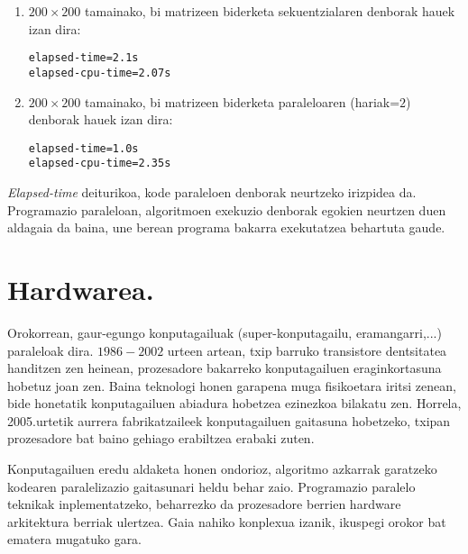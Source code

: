 \begin{enumerate}
\item $200 \times 200$ tamainako, bi matrizeen biderketa sekuentzialaren denborak hauek izan dira:
\begin{lstlisting}
elapsed-time=2.1s
elapsed-cpu-time=2.07s
\end{lstlisting}

\item $200 \times 200$ tamainako, bi matrizeen biderketa paraleloaren (hariak=$2$) denborak hauek izan dira:
\begin{lstlisting}
elapsed-time=1.0s
elapsed-cpu-time=2.35s
\end{lstlisting}
 
 
\end{enumerate}
 
\emph{Elapsed-time} deiturikoa, kode paraleloen denborak neurtzeko irizpidea da. Programazio paraleloan, algoritmoen exekuzio denborak egokien neurtzen duen aldagaia da baina, une berean programa bakarra exekutatzea behartuta gaude.       


\section{Hardwarea.}


Orokorrean, gaur-egungo konputagailuak (super-konputagailu, eramangarri,...) paraleloak dira. $1986-2002$ urteen artean, txip barruko transistore dentsitatea handitzen zen heinean, prozesadore bakarreko konputagailuen eraginkortasuna hobetuz joan zen. Baina teknologi honen garapena muga fisikoetara iritsi zenean, bide honetatik konputagailuen abiadura hobetzea ezinezkoa bilakatu zen. Horrela, 2005.urtetik aurrera fabrikatzaileek konputagailuen gaitasuna hobetzeko, txipan prozesadore bat baino gehiago erabiltzea erabaki zuten.  


Konputagailuen eredu aldaketa honen ondorioz, algoritmo azkarrak garatzeko kodearen paralelizazio gaitasunari heldu behar zaio. Programazio paralelo teknikak inplementatzeko, beharrezko da prozesadore berrien hardware arkitektura berriak ulertzea. Gaia nahiko konplexua izanik, ikuspegi orokor bat ematera mugatuko gara.

